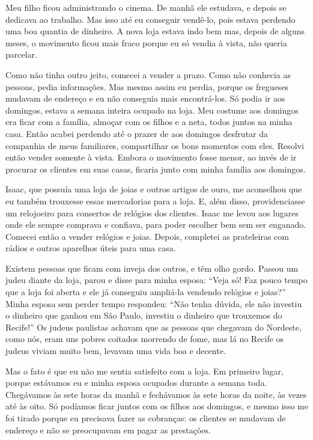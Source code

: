 Meu filho ficou administrando o cinema. De manhã ele estudava, e depois
se dedicava ao trabalho. Mas isso até eu conseguir
vendê-lo, pois estava perdendo uma boa quantia de dinheiro. A nova loja estava indo
bem mas, depois de alguns meses, o movimento ficou mais fraco porque eu
só vendia à vista, não queria parcelar. 

Como não tinha outro jeito, comecei a vender a prazo. Como não conhecia as pessoas, pedia
informações. Mas mesmo assim eu perdia, porque os fregueses mudavam de
endereço e eu não conseguia mais encontrá-los. Só podia ir aos domingos, estava a semana inteira ocupado na loja. Meu costume aos
domingos era ficar com a família, almoçar com os filhos e a neta, todos
juntos na minha casa. Então acabei perdendo até o prazer de aos domingos desfrutar da companhia de meus familiares,
compartilhar os bons momentos com eles. Resolvi então vender somente à
vista. Embora o movimento fosse menor, ao invés de ir procurar os clientes
em suas casas, ficaria junto com minha família aos domingos.

Isaac, que possuía uma loja de joias e
outros artigos de ouro, me aconselhou que eu também trouxesse essas mercadorias para a 
loja. E, além disso, providenciasse um relojoeiro para
consertos de relógios dos clientes. Isaac
me levou aos lugares onde ele sempre comprava e confiava, para poder escolher
bem sem ser enganado. Comecei então a vender relógios e joias. Depois, completei as prateleiras com rádios e outros aparelhos úteis para uma casa.

Existem pessoas que ficam com inveja dos outros, e têm olho gordo. Passou
um judeu diante da loja, parou e disse para minha esposa: ``Veja
só! Faz pouco tempo que a loja foi aberta e ele já conseguiu ampliá-la
vendendo relógios e joias?'' Minha esposa sem perder tempo respondeu:
``Não tenha dúvida, ele não investiu o dinheiro que ganhou em São Paulo,
investiu o dinheiro que trouxemos do Recife!'' Os judeus paulistas achavam que as pessoas que chegavam do Nordeste,
como nós, eram uns pobres coitados morrendo de fome, mas lá no Recife os
judeus viviam muito bem, levavam uma vida boa e decente.

Mas o fato é que eu não me sentia satisfeito com a loja. Em primeiro lugar,
porque estávamos eu e minha esposa ocupados durante a semana toda. Chegávamos às 
sete horas da manhã e fechávamos às sete horas da noite,
às vezes até às oito. Só podíamos ficar juntos com os filhos aos
domingos, e mesmo isso me foi tirado porque eu precisava
fazer as cobranças: os clientes se mudavam de endereço e
não se preocupavam em pagar as prestações.

